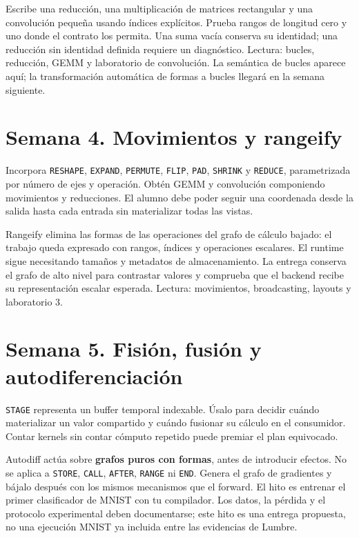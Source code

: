 \documentclass[12pt,a4paper,oneside]{report}
\begin{document}
Escribe una reducción, una multiplicación de matrices rectangular y una convolución pequeña usando índices explícitos. Prueba rangos de longitud cero y uno donde el contrato los permita. Una suma vacía conserva su identidad; una reducción sin identidad definida requiere un diagnóstico. Lectura: bucles, reducción, GEMM y laboratorio de convolución. La semántica de bucles aparece aquí; la transformación automática de formas a bucles llegará en la semana siguiente.

\section{Semana 4. Movimientos y rangeify}
Incorpora \texttt{RESHAPE}, \texttt{EXPAND}, \texttt{PERMUTE}, \texttt{FLIP}, \texttt{PAD}, \texttt{SHRINK} y \texttt{REDUCE}, parametrizada por número de ejes y operación. Obtén GEMM y convolución componiendo movimientos y reducciones. El alumno debe poder seguir una coordenada desde la salida hasta cada entrada sin materializar todas las vistas.

Rangeify elimina las formas de las operaciones del grafo de cálculo bajado: el trabajo queda expresado con rangos, índices y operaciones escalares. El runtime sigue necesitando tamaños y metadatos de almacenamiento. La entrega conserva el grafo de alto nivel para contrastar valores y comprueba que el backend recibe su representación escalar esperada. Lectura: movimientos, broadcasting, layouts y laboratorio 3.

\section{Semana 5. Fisión, fusión y autodiferenciación}
\texttt{STAGE} representa un buffer temporal indexable. Úsalo para decidir cuándo materializar un valor compartido y cuándo fusionar su cálculo en el consumidor. Contar kernels sin contar cómputo repetido puede premiar el plan equivocado.

Autodiff actúa sobre \textbf{grafos puros con formas}, antes de introducir efectos. No se aplica a \texttt{STORE}, \texttt{CALL}, \texttt{AFTER}, \texttt{RANGE} ni \texttt{END}. Genera el grafo de gradientes y bájalo después con los mismos mecanismos que el forward. El hito es entrenar el primer clasificador de MNIST con tu compilador. Los datos, la pérdida y el protocolo experimental deben documentarse; este hito es una entrega propuesta, no una ejecución MNIST ya incluida entre las evidencias de Lumbre.
\end{document}
